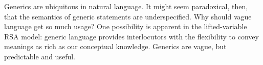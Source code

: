 \documentclass[10pt,letterpaper]{article}
\begin{document}
Generics are ubiquitous in natural language. It might seem paradoxical, then, that the semantics of generic statements are underspecified. Why should vague language get so much usage? One possibility is apparent in the lifted-variable RSA model: generic language provides interlocutors with the flexibility to convey meanings as rich as our conceptual knowledge. %
Generics are vague, but predictable and useful.



%

%
 
\end{document}
